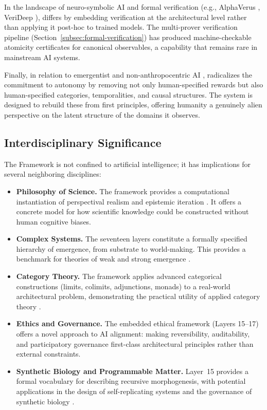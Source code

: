 In the landscape of neuro-symbolic AI and formal verification (e.g., AlphaVerus \cite{wang2023}, VeriDeep \cite{chen2024}), \Apeiron{} differs by embedding verification at the architectural level rather than applying it post-hoc to trained models. The multi-prover verification pipeline (Section~\ref{subsec:formal-verification}) has produced machine-checkable atomicity certificates for canonical observables, a capability that remains rare in mainstream AI systems.

Finally, in relation to emergentist and non-anthropocentric AI \cite{thompson2007, stanley2019}, \Apeiron{} radicalizes the commitment to autonomy by removing not only human-specified rewards but also human-specified categories, temporalities, and causal structures. The system is designed to rebuild these from first principles, offering humanity a genuinely alien perspective on the latent structure of the domains it observes.

\subsection{Interdisciplinary Significance}
\label{subsec:interdisciplinary}

The \Apeiron{} Framework is not confined to artificial intelligence; it has implications for several neighboring disciplines:

\begin{itemize}
    \item \textbf{Philosophy of Science.} The framework provides a computational instantiation of perspectival realism \cite{massimi2022} and epistemic iteration \cite{chang2012}. It offers a concrete model for how scientific knowledge could be constructed without human cognitive biases.
    
    \item \textbf{Complex Systems.} The seventeen layers constitute a formally specified hierarchy of emergence, from substrate to world-making. This provides a benchmark for theories of weak and strong emergence \cite{bedau1997}.
    
    \item \textbf{Category Theory.} The framework applies advanced categorical constructions (limits, colimits, adjunctions, monads) to a real-world architectural problem, demonstrating the practical utility of applied category theory \cite{fong2019}.
    
    \item \textbf{Ethics and Governance.} The embedded ethical framework (Layers 15--17) offers a novel approach to AI alignment: making reversibility, auditability, and participatory governance first-class architectural principles rather than external constraints.
    
    \item \textbf{Synthetic Biology and Programmable Matter.} Layer~15 provides a formal vocabulary for describing recursive morphogenesis, with potential applications in the design of self-replicating systems and the governance of synthetic biology \cite{church2014, goldstein2005}.
\end{itemize}

